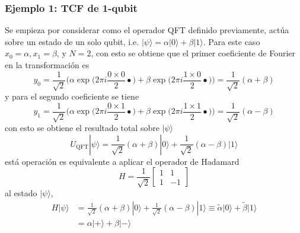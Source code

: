 \documentclass[a4paper]{article}
\begin{document}
\subsubsection{Ejemplo 1: TCF de 1-qubit}
Se empieza por considerar como el operador QFT definido previamente, actúa sobre  un estado de un solo qubit, i.e. $|\psi\rangle=\alpha|0\rangle+\beta |1\rangle$. Para este caso $x_0=\alpha, x_1=\beta$, y $N=2$, con esto se obtiene
que el primer coeficiente de Fourier en la transformación es 
\begin{equation}
y_0=\frac{1}{\sqrt{2}}\Bigg( \alpha \exp\bigg( 2\pi i \frac{0\times 0}{2}{•} \bigg) + \beta \exp\bigg( 2\pi i \frac{1\times 0}{2}{•} \bigg) \Bigg)=\frac{1}{\sqrt{2}}(\alpha+\beta)
\end{equation}
y para el segundo coeficiente se tiene
\begin{equation}
y_1=\frac{1}{\sqrt{2}}\Bigg( \alpha \exp\bigg( 2\pi i \frac{0\times 1}{2}{•} \bigg) + \beta \exp\bigg( 2\pi i \frac{1\times 1}{2}{•} \bigg) \Bigg)=\frac{1}{\sqrt{2}}(\alpha-\beta)
\end{equation}
con esto se obtiene el resultado total sobre $|\psi\rangle$
\begin{equation}
U_{\text{QFT}}|\psi\rangle=\frac{1}{\sqrt{2}}(\alpha+\beta)|0\rangle + \frac{1}{\sqrt{2}}(\alpha-\beta)|1\rangle
\end{equation}
está operación es equivalente a aplicar el operador de Hadamard
\begin{equation}\label{eq::Hadamard_gate}
H=\frac{1}{\sqrt{2}}
\begin{bmatrix}
1&1\\
1&-1
\end{bmatrix}
\end{equation}
al estado $\vert \psi\rangle$, 
\begin{equation}
\begin{aligned}
H\vert\psi\rangle&=\frac{1}{\sqrt{2}}(\alpha+\beta)|0\rangle + \frac{1}{\sqrt{2}}(\alpha-\beta)|1\rangle\equiv \tilde{\alpha}\vert 0\rangle+ \tilde{\beta}\vert 1\rangle\\
&=\alpha \vert + \rangle +\beta \vert - \rangle
\end{aligned}
\end{equation}
\end{document}
